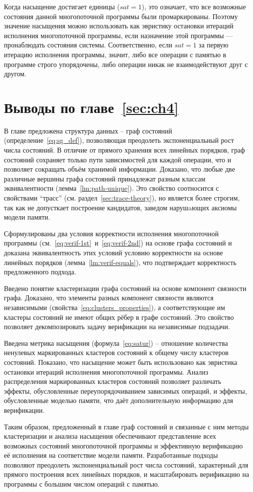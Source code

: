 Когда насыщение достигает единицы ($sat = 1$), это означает, что все
возможные состояния данной многопоточной программы были
промаркированы. Поэтому значение насыщения можно использовать как
эвристику остановки итераций исполнения многопоточной программы, если
назначение этой программы — пронаблюдать состояния системы.
Соответственно, если $sat = 1$ за первую итерацию исполнения
программы, значит, либо все операции с памятью в программе строго
упорядочены, либо операции никак не взаимодействуют друг с другом.

\section{Выводы по главе~\ref{sec:ch4}}

В главе предложена структура данных -- граф состояний
(определение~\ref{eq:sg_def}),
позволяющая преодолеть экспоненциальный рост числа состояний. В
отличие от прямого
хранения всех линейных порядков, граф состояний сохраняет только
пути зависимостей для каждой операции, что и позволяет сокращать
объём хранимой информации.
Доказано, что любые две
различные вершины графа состояний принадлежат разным классам
эквивалентности (лемма~\ref{lm:path-unique}).
Это свойство соотносится с свойствами ``трасс'' (см.
раздел~\ref{sec:trace-theory}), но является более строгим, так как не
допусткает построение кандидатов, заведом нарушaющих аксиомы модели памяти.

Сформулированы два условия корректности исполнения многопоточной
программы (см.~\ref{eq:verif-1st}~и~\ref{eq:verif-2nd}) на основе
графа состояний и доказана
эквивалентность этих условий условию корректности на основе
линейных порядков (лемма~\ref{lm:verif-equals}), что подтверждает
корректность предложенного подхода.

Введено понятие кластеризации графа состояний на основе компонент
связности графа​.
Доказано, что элементы разных компонент связности являются
независимыми (свойства~\ref{eq:clusters_properties}), а
соответствующие им кластеры состояний не имеют общих рёбер в графе
состояний. Это свойство позволяет декомпозировать задачу
верификации на независимые подзадачи.

Введена метрика насыщения (формула~\ref{eq:satur}) -- отношение
количества ненулевых маркированных кластеров состояний к общему
числу кластеров состояний. Показано, что насыщение может быть
использовано как эвристика остановки итераций исполнения
многопоточной программы. Анализ распределения маркированных
кластеров состояний позволяет различать эффекты, обусловленные
переупорядочиванием зависимых операций, и эффекты, обусловленные
моделью памяти, что даёт дополнительную информацию для верификации.

Таким образом, предложенный в главе граф состояний и связанные с
ним методы кластеризации и анализа насыщения обеспечивают
представление всех возможных состояний многопоточной
программы и эффективную верификацию её исполнения на соответствие
модели памяти. Разработанные подходы позволяют преодолеть
экспоненциальный рост числа состояний, характерный для прямого
построения всех линейных порядков, и масштабировать верификацию на
программы с большим числом операций с памятью.

\clearpage
